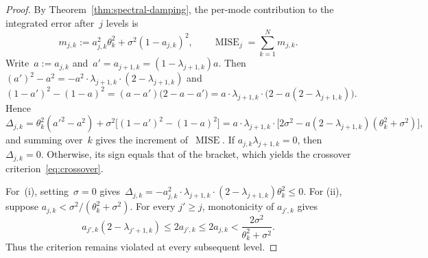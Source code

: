 \documentclass[12pt]{article}
\DeclareMathOperator{\mise}{MISE}
\begin{document}
\begin{proof}
By Theorem~\ref{thm:spectral-damping}, the per-mode contribution to the integrated error after~$j$ levels is
\[
    m_{j,k}:=a_{j,k}^2\theta_k^2+\sigma^2(1-a_{j,k})^2,\qquad \mise_j=\sum_{k=1}^N m_{j,k}.
\]
Write~$a:=a_{j,k}$ and~$a'=a_{j+1,k}=(1-\lambda_{j+1,k}) a$. Then $(a')^2-a^2=-a^2\cdot\lambda_{j+1,k}\cdot(2-\lambda_{j+1,k})$ and
\[
    (1-a')^2-(1-a)^2=(a-a')\big(2-a-a'\big)=a\cdot\lambda_{j+1,k}\cdot\big(2-a(2-\lambda_{j+1,k})\big).
\]
Hence
\[
    \Delta_{j,k}=\theta_k^2(a'^2-a^2)+\sigma^2\big[(1-a')^2-(1-a)^2\big]
    =a\cdot \lambda_{j+1,k} \cdot\big[2\sigma^2-a(2- \lambda_{j+1,k})(\theta_k^2+\sigma^2)\big],
\]
and summing over~$k$ gives the increment of~$\mise$. If $a_{j,k}\lambda_{j+1,k}=0$, then $\Delta_{j,k}=0$.
Otherwise, its sign equals that of the bracket, which yields
the crossover criterion~\eqref{eq:crossover}. 

For~(i), setting~$\sigma=0$ gives~$\Delta_{j,k}=-a_{j,k}^2\cdot\lambda_{j+1,k}\cdot (2-\lambda_{j+1,k})\theta_k^2\le0$. For (ii), suppose $a_{j,k}<\sigma^2/(\theta_k^2+\sigma^2)$. For every $j'\geq j$, monotonicity of $a_{j',k}$ gives
\[
a_{j',k}(2-\lambda_{j'+1,k})
\leq 2a_{j',k}
\leq 2a_{j,k}
<\frac{2\sigma^2}{\theta_k^2+\sigma^2}.
\]
Thus the criterion remains violated at every subsequent level.
\end{proof}
\end{document}
